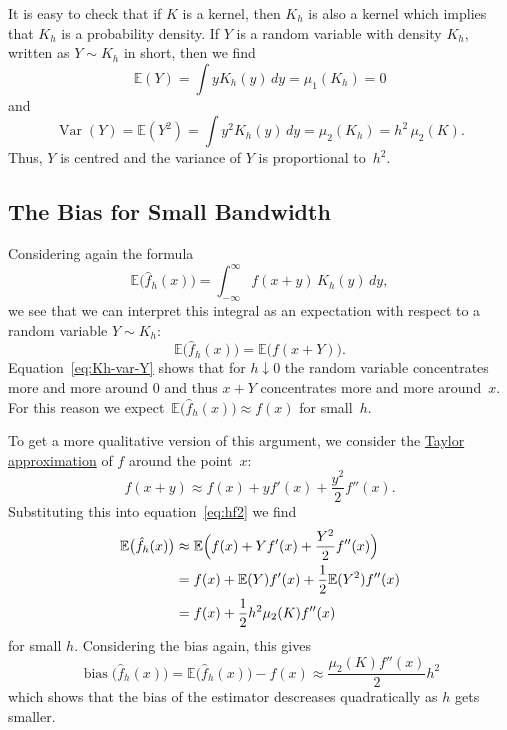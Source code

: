 \documentclass[
  a4paper,
]{article}
\theoremstyle{definition}
\theoremstyle{definition}
\theoremstyle{definition}
\theoremstyle{definition}
\theoremstyle{remark}
\begin{document}
It is easy to check that if \(K\) is a kernel, then \(K_h\) is also a kernel which
implies that \(K_h\) is a probability density. If \(Y\) is a random variable with
density \(K_h\), written as \(Y \sim K_h\) in short, then we find
\begin{equation*}
  \mathbb{E}(Y)
  = \int y K_h(y) \,dy
  = \mu_1(K_h)
  = 0
\end{equation*}
and
\begin{equation}
  \mathop{\mathrm{Var}}(Y)
  = \mathbb{E}(Y^2)
  = \int y^2 K_h(y) \,dy
  = \mu_2(K_h)
  = h^2 \, \mu_2(K).  \label{eq:Kh-var-Y}
\end{equation}
Thus, \(Y\) is centred and the variance of \(Y\) is proportional to~\(h^2\).

\hypertarget{the-bias-for-small-bandwidth}{%
\subsection{The Bias for Small Bandwidth}\label{the-bias-for-small-bandwidth}}

Considering again the formula
\begin{equation*}
    \mathbb{E}\bigl(\hat f_h(x)\bigr)
    = \int_{-\infty}^\infty f(x+y) \, K_h(y) \, dy,
\end{equation*}
we see that we can interpret this integral as an expectation
with respect to a random variable \(Y \sim K_h\):
\begin{equation}
    \mathbb{E}\bigl(\hat f_h(x)\bigr)
    = \mathbb{E}\bigl( f(x+Y) \bigr).  \label{eq:hf2}
\end{equation}
Equation~\eqref{eq:Kh-var-Y} shows that for \(h \downarrow 0\) the random
variable concentrates more and more around \(0\) and thus \(x+Y\) concentrates
more and more around~\(x\). For this reason we
expect~\(\mathbb{E}\bigl(\hat f_h(x)\bigr) \approx f(x)\) for small~\(h\).

To get a more qualitative version of this argument, we consider the
\href{https://en.wikipedia.org/wiki/Taylor\%27s_theorem}{Taylor approximation}
of \(f\) around the point~\(x\):
\begin{equation*}
  f(x + y)
  \approx f(x) + y f'(x) + \frac{y^2}{2} f''(x).
\end{equation*}
Substituting this into equation~\eqref{eq:hf2} we find
\begin{align*}
    \mathbb{E}\bigl(\hat f_h(x)\bigr)
    &\approx \mathbb{E}\Bigl( f(x) + Y f'(x) + \frac{Y^2}{2} f''(x) \Bigr) \\
    &= f(x) + \mathbb{E}(Y) f'(x) + \frac12 \mathbb{E}(Y^2) f''(x) \\
    &= f(x) + \frac12 h^2 \mu_2(K) f''(x)
\end{align*}
for small \(h\). Considering the bias again, this gives
\begin{equation}
  \mathop{\mathrm{bias}}\bigl( \hat f_h(x) \bigr)
  = \mathbb{E}\bigl( \hat f_h(x) \bigr) - f(x)
  \approx \frac{\mu_2(K) f''(x)}{2} h^2  \label{eq:fhatbias}
\end{equation}
which shows that the bias of the estimator descreases quadratically
as \(h\) gets smaller.
\end{document}
